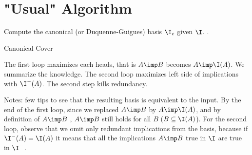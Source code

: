 \section{"Usual" Algorithm}

Compute the canonical (or Duquenne-Guigues) basis $\I_c$ given $\I$. 
\cite{guigues_familles_1986, b._ganter_conceptual_2016}. 

\begin{algorithm}[H]

\BlankLine
\BlankLine



\caption{Canonical Cover}	
\end{algorithm}


\vspace{1.2em}

\noindent The first loop maximizes each heads, that is $A \imp B$ becomes $A 
\imp \I(A)$. We summarize the knowledge. The second loop maximizes left side
of implications with $\I^{-}(A)$. The second step kills redundancy.

\vspace{1.2em}

\noindent Notes: few tips to see that the resulting basis is equivalent to the 
input. By the end of the first loop, since we replaced $A \imp B$ by $A \imp 
\I(A)$, and by definition of $A \imp B$ , $A \imp B$ still holds for all $B$
($B \subseteq \I(A)$). For the second loop, observe that we omit only redundant
implications from the basis, because if $\I^{-}(A) = \I(A)$ it means that all
the implications $A \imp B$ true in $\I$ are true in $\I^{-}$. 